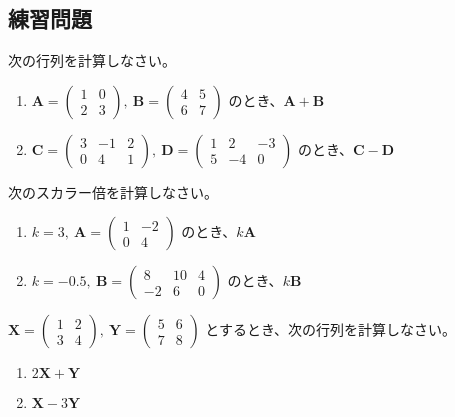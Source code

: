 \subsection{練習問題}
\begin{quiz}
次の行列を計算しなさい。
\begin{enumerate}
\item $\bm{A} = \begin{pmatrix} 1 & 0 \\ 2 & 3 \end{pmatrix},\ \bm{B} = \begin{pmatrix} 4 & 5 \\ 6 & 7 \end{pmatrix}$ のとき、$\bm{A} + \bm{B}$
\item $\bm{C} = \begin{pmatrix} 3 & -1 & 2 \\ 0 & 4 & 1 \end{pmatrix},\ \bm{D} = \begin{pmatrix} 1 & 2 & -3 \\ 5 & -4 & 0 \end{pmatrix}$ のとき、$\bm{C} - \bm{D}$
\end{enumerate}
\end{quiz}

\begin{quiz}
次のスカラー倍を計算しなさい。
\begin{enumerate}
\item $k = 3,\ \bm{A} = \begin{pmatrix} 1 & -2 \\ 0 & 4 \end{pmatrix}$ のとき、$k\bm{A}$
\item $k = -0.5,\ \bm{B} = \begin{pmatrix} 8 & 10 & 4 \\ -2 & 6 & 0 \end{pmatrix}$ のとき、$k\bm{B}$
\end{enumerate}
\end{quiz}

\begin{quiz}
$\bm{X} = \begin{pmatrix} 1 & 2 \\ 3 & 4 \end{pmatrix},\ \bm{Y} = \begin{pmatrix} 5 & 6 \\ 7 & 8 \end{pmatrix}$ とするとき、次の行列を計算しなさい。
\begin{enumerate}
\item $2\bm{X} + \bm{Y}$
\item $\bm{X} - 3\bm{Y}$
\end{enumerate}
\end{quiz}

